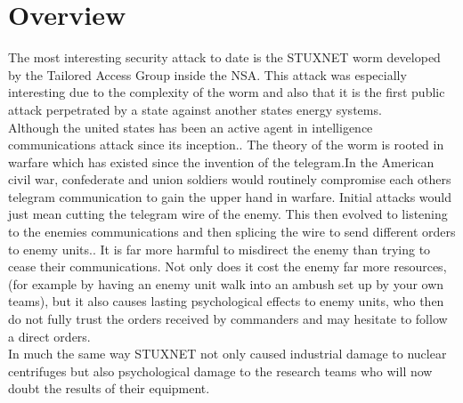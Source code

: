 \documentclass{article}
\begin{document}
\section{Overview}\label{sec:overview}
The most interesting security attack to date is the STUXNET worm developed by the Tailored Access Group inside the NSA. This attack was especially interesting due to the complexity of the worm and also that it is the first public attack perpetrated by a state against another states energy systems. \\


Although the united states has been an active agent in intelligence communications attack since its inception.. 
The theory of the worm is rooted in warfare which has existed since the invention of the telegram.In the American civil war, confederate and union soldiers would routinely compromise each others telegram communication to gain the upper hand in warfare.
Initial attacks would just mean cutting the telegram wire of the enemy. This then evolved to listening to the enemies communications and then splicing the wire to send different orders to enemy units..
It is far more harmful to misdirect the enemy than trying to cease their communications. Not only does it cost the enemy far more resources, (for example by having an enemy unit walk into an ambush set up by your own teams), but it also causes lasting psychological effects to enemy units, who then do not fully trust the orders received by commanders and may hesitate to follow a direct orders.\\
In much the same way STUXNET not only caused industrial damage to nuclear centrifuges but also psychological damage to the research teams who will now doubt the results of their equipment.
\end{document}
